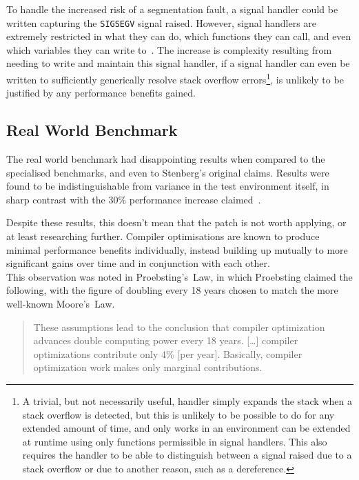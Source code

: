 To handle the increased risk of a segmentation fault, a signal handler could be written capturing the \texttt{SIGSEGV} signal raised. However, signal handlers are extremely restricted in what they can do, which functions they can call, and even which variables they can write to~\cite{signalhandling}. The increase is complexity resulting from needing to write and maintain this signal handler, if a signal handler can even be written to sufficiently generically resolve stack overflow errors\footnote{A trivial, but not necessarily useful, handler simply expands the stack when a stack overflow is detected, but this is unlikely to be possible to do for any extended amount of time, and only works in an environment can be extended at runtime using only functions permissible in signal handlers. This also requires the handler to be able to distinguish between a signal raised due to a stack overflow or due to another reason, such as a  dereference.}, is unlikely to be justified by any performance benefits gained.

\subsection{Real World Benchmark}

The real world benchmark had disappointing results when compared to the specialised benchmarks, and even to Stenberg's original claims. Results were found to be indistinguishable from variance in the test environment itself, in sharp contrast with the 30\% performance increase claimed~\cite{curlmalloc}.

Despite these results, this doesn't mean that the patch is not worth applying, or at least researching further. Compiler optimisations are known to produce minimal performance benefits individually, instead building up mutually to more significant gains over time and in conjunction with each other.\\
This observation was noted in Proebsting's~Law, in which Proebsting claimed the following, with the figure of doubling every 18 years chosen to match the more well-known Moore's~Law.

\begin{quote}
	These assumptions lead to the conclusion that compiler optimization advances double computing power every 18 years. […] compiler optimizations contribute only 4\% [per year]. Basically, compiler optimization work makes only marginal contributions.~\cite{proebstingdecl}
\end{quote}

